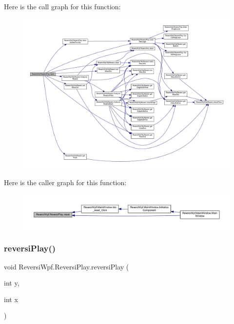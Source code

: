 Here is the call graph for this function\+:\nopagebreak
\begin{figure}[H]
\begin{center}
\leavevmode
\includegraphics[width=350pt]{class_reversi_wpf_1_1_reversi_play_aee0447f5d955d0b2b66d14b491d90e81_cgraph}
\end{center}
\end{figure}
Here is the caller graph for this function\+:\nopagebreak
\begin{figure}[H]
\begin{center}
\leavevmode
\includegraphics[width=350pt]{class_reversi_wpf_1_1_reversi_play_aee0447f5d955d0b2b66d14b491d90e81_icgraph}
\end{center}
\end{figure}
\mbox{\label{class_reversi_wpf_1_1_reversi_play_a735fd2b6a5f7be5089f702f5265cd183}} 
\subsubsection{\texorpdfstring{reversi\+Play()}{reversiPlay()}}
{\footnotesize\ttfamily void Reversi\+Wpf.\+Reversi\+Play.\+reversi\+Play (\begin{DoxyParamCaption}\item[{int}]{y,  }\item[{int}]{x }\end{DoxyParamCaption})}



